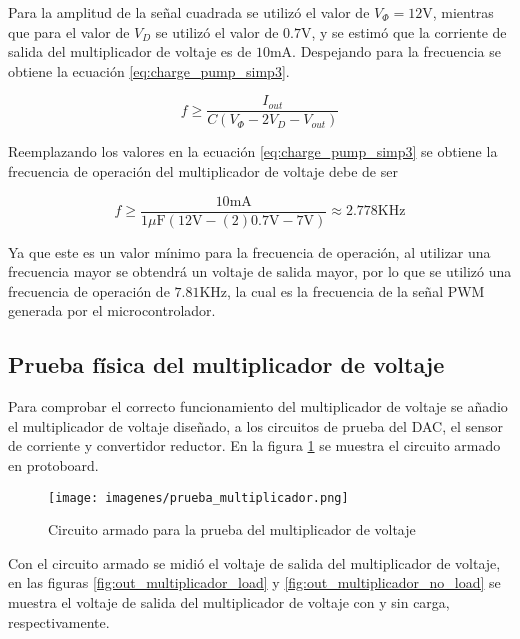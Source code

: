     Para la amplitud de la señal cuadrada se utilizó el valor de 
    $V_\Phi = 12 \text{V}$, mientras que para 
    el valor de $V_D$ se utilizó el valor de $0.7\text{V}$, y se estimó que
    la corriente de salida del multiplicador de voltaje es de $10\text{mA}$.
    Despejando para la frecuencia se obtiene la ecuación \ref{eq:charge_pump_simp3}.

    \begin{equation}
        f \geq \frac{I_{out}}{C(V_\Phi - 2V_D - V_{out})}
        \label{eq:charge_pump_simp3}
    \end{equation}

    Reemplazando los valores en la ecuación \ref{eq:charge_pump_simp3} se obtiene
    la frecuencia de operación del multiplicador de voltaje debe de ser 

        $$
            f \geq \frac{10\text{mA}}{1\mu\text{F}(12\text{V} - (2)0.7\text{V}
             - 7\text{V})} \approx 2.778\text{KHz}
        $$

    Ya que este es un valor mínimo para la frecuencia de operación, al utilizar
    una frecuencia mayor se obtendrá un voltaje de salida mayor, por lo que se
    utilizó una frecuencia de operación de $7.81\text{KHz}$, la cual es la
    frecuencia de la señal PWM generada por el microcontrolador.

    \subsection{Prueba física del multiplicador de voltaje}

    Para comprobar el correcto funcionamiento del multiplicador de voltaje
    se añadio el multiplicador de voltaje diseñado, a los circuitos de prueba
    del DAC, el sensor de corriente  y convertidor reductor. En la figura
    \ref{fig:prueba_multiplicador} se muestra el circuito armado en protoboard.
    
    \begin{figure}[H]
        \centering
        \texttt{[image: imagenes/prueba\_multiplicador.png]}
        \caption{Circuito armado para la prueba del multiplicador de voltaje}
        \label{fig:prueba_multiplicador}
    \end{figure}

    Con el circuito armado se midió el voltaje de salida del multiplicador
    de voltaje, en las figuras \ref{fig:out_multiplicador_load} y \ref{fig:out_multiplicador_no_load}
    se muestra el voltaje de salida del multiplicador de voltaje con y sin carga,
    respectivamente.

